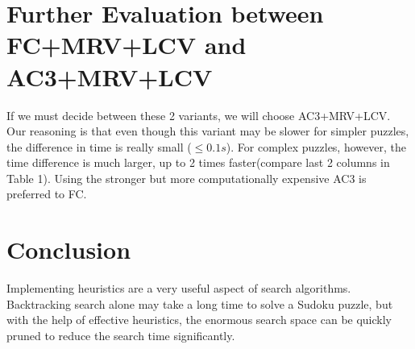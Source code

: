 \documentclass[runningheads]{llncs}
\begin{document}
\section{Further Evaluation between FC+MRV+LCV and AC3+MRV+LCV}
If we must decide between these 2 variants, we will choose AC3+MRV+LCV. Our reasoning is that even though this variant may be slower for simpler puzzles, the difference in time is really small ($\leq 0.1s$). For complex puzzles, however, the time difference is much larger, up to 2 times faster(compare last 2 columns in Table 1). Using the stronger but more computationally expensive AC3 is preferred to FC.

\section{Conclusion}
Implementing heuristics are a very useful aspect of search algorithms. Backtracking search alone may take a long time to solve a Sudoku puzzle, but with the help of effective heuristics, the enormous search space can be quickly pruned to reduce the search time significantly. 
\end{document}
